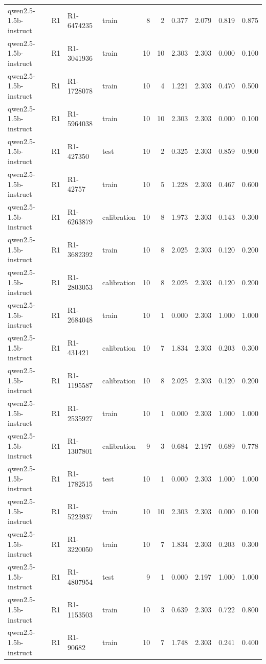 \begin{table}
\begin{tabular}{llllrrrrrr}
qwen2.5-1.5b-instruct & R1 & R1-6474235 & train & 8 & 2 & 0.377 & 2.079 & 0.819 & 0.875 \\
qwen2.5-1.5b-instruct & R1 & R1-3041936 & train & 10 & 10 & 2.303 & 2.303 & 0.000 & 0.100 \\
qwen2.5-1.5b-instruct & R1 & R1-1728078 & train & 10 & 4 & 1.221 & 2.303 & 0.470 & 0.500 \\
qwen2.5-1.5b-instruct & R1 & R1-5964038 & train & 10 & 10 & 2.303 & 2.303 & 0.000 & 0.100 \\
qwen2.5-1.5b-instruct & R1 & R1-427350 & test & 10 & 2 & 0.325 & 2.303 & 0.859 & 0.900 \\
qwen2.5-1.5b-instruct & R1 & R1-42757 & train & 10 & 5 & 1.228 & 2.303 & 0.467 & 0.600 \\
qwen2.5-1.5b-instruct & R1 & R1-6263879 & calibration & 10 & 8 & 1.973 & 2.303 & 0.143 & 0.300 \\
qwen2.5-1.5b-instruct & R1 & R1-3682392 & train & 10 & 8 & 2.025 & 2.303 & 0.120 & 0.200 \\
qwen2.5-1.5b-instruct & R1 & R1-2803053 & calibration & 10 & 8 & 2.025 & 2.303 & 0.120 & 0.200 \\
qwen2.5-1.5b-instruct & R1 & R1-2684048 & train & 10 & 1 & 0.000 & 2.303 & 1.000 & 1.000 \\
qwen2.5-1.5b-instruct & R1 & R1-431421 & calibration & 10 & 7 & 1.834 & 2.303 & 0.203 & 0.300 \\
qwen2.5-1.5b-instruct & R1 & R1-1195587 & calibration & 10 & 8 & 2.025 & 2.303 & 0.120 & 0.200 \\
qwen2.5-1.5b-instruct & R1 & R1-2535927 & train & 10 & 1 & 0.000 & 2.303 & 1.000 & 1.000 \\
qwen2.5-1.5b-instruct & R1 & R1-1307801 & calibration & 9 & 3 & 0.684 & 2.197 & 0.689 & 0.778 \\
qwen2.5-1.5b-instruct & R1 & R1-1782515 & test & 10 & 1 & 0.000 & 2.303 & 1.000 & 1.000 \\
qwen2.5-1.5b-instruct & R1 & R1-5223937 & train & 10 & 10 & 2.303 & 2.303 & 0.000 & 0.100 \\
qwen2.5-1.5b-instruct & R1 & R1-3220050 & train & 10 & 7 & 1.834 & 2.303 & 0.203 & 0.300 \\
qwen2.5-1.5b-instruct & R1 & R1-4807954 & test & 9 & 1 & 0.000 & 2.197 & 1.000 & 1.000 \\
qwen2.5-1.5b-instruct & R1 & R1-1153503 & train & 10 & 3 & 0.639 & 2.303 & 0.722 & 0.800 \\
qwen2.5-1.5b-instruct & R1 & R1-90682 & train & 10 & 7 & 1.748 & 2.303 & 0.241 & 0.400 \\

\end{tabular}
\end{table}
